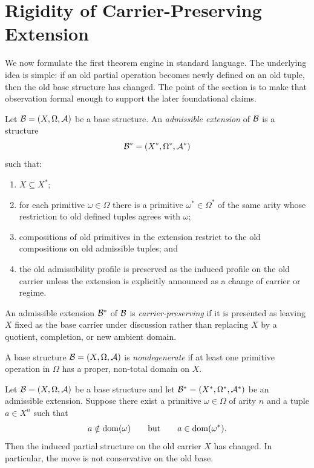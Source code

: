 \section{Rigidity of Carrier-Preserving Extension}\label{sec:rigidity}

We now formulate the first theorem engine in standard language. The underlying idea is simple: if an old partial operation becomes newly defined on an old tuple, then the old base structure has changed. The point of the section is to make that observation formal enough to support the later foundational claims.

\begin{definition}
Let $\mathcal{B}=(X,\Omega,\mathcal{A})$ be a base structure. An \emph{admissible extension} of $\mathcal{B}$ is a structure
\[
\mathcal{B}^*=(X^*,\Omega^*,\mathcal{A}^*)
\]
such that:
\begin{enumerate}[label=(\roman*)]
    \item $X\subseteq X^*$;
    \item for each primitive $\omega\in\Omega$ there is a primitive $\omega^*\in\Omega^*$ of the same arity whose restriction to old defined tuples agrees with $\omega$;
    \item compositions of old primitives in the extension restrict to the old compositions on old admissible tuples; and
    \item the old admissibility profile is preserved as the induced profile on the old carrier unless the extension is explicitly announced as a change of carrier or regime.
\end{enumerate}
\end{definition}

\begin{definition}
An admissible extension $\mathcal{B}^*$ of $\mathcal{B}$ is \emph{carrier-preserving} if it is presented as leaving $X$ fixed as the base carrier under discussion rather than replacing $X$ by a quotient, completion, or new ambient domain.
\end{definition}

\begin{definition}[Nondegeneracy]
A base structure $\mathcal{B}=(X,\Omega,\mathcal{A})$ is \emph{nondegenerate} if at least one primitive operation in $\Omega$ has a proper, non-total domain on $X$.
\end{definition}

\begin{lemma}\label{lem:old-graph-rigidity}
Let $\mathcal{B}=(X,\Omega,\mathcal{A})$ be a base structure and let $\mathcal{B}^*=(X^*,\Omega^*,\mathcal{A}^*)$ be an admissible extension. Suppose there exist a primitive $\omega\in\Omega$ of arity $n$ and a tuple $a\in X^n$ such that
\[
a\notin \operatorname{dom}(\omega)
\qquad\text{but}\qquad
 a\in \operatorname{dom}(\omega^*).
\]
Then the induced partial structure on the old carrier $X$ has changed. In particular, the move is not conservative on the old base.
\end{lemma}

